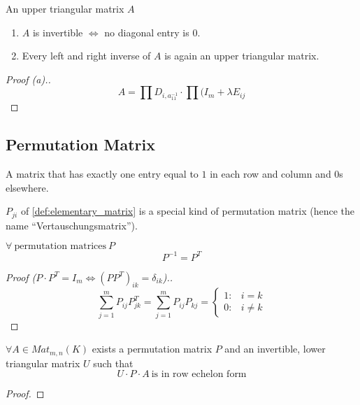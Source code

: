 \begin{proposition}
   An upper triangular matrix \(A\)

   \begin{enumerate}[label=(\alph*)]
      \item \(A\) is invertible \(\iff\) no diagonal entry is 0.
      \item Every left and right inverse of \(A\) is again an upper triangular matrix.
   \end{enumerate}
\end{proposition}
\begin{proof}[Proof (a).]
   \[A = \prod D_{i, a_{11}^{-1}} \cdot \prod(I_m + \lambda E_{ij}\]
\end{proof}

\subsection{Permutation Matrix}
\begin{definition}
   A matrix that has exactly one entry equal to \(1\) in each row and column and 0s elsewhere.
\end{definition}
\begin{remark}
   \(P_{ji}\) of \cref{def:elementary_matrix} is a special kind of permutation matrix (hence the name ``Vertauschungsmatrix'').
\end{remark}

\begin{proposition}
   \(\forall~\text{permutation matrices}~P\)
   \[P^{-1} = P^T\]
\end{proposition}
\begin{proof}[Proof (\(P \cdot P^T = I_m \iff (P P^T)_{ik} = \delta_{ik}\)).]
   \[\sum_{j=1}^m P_{ij} P_{jk}^T = \sum_{j=1}^m P_{ij} P_{kj} = \begin{cases}1: & i=k\\ 0: & i \neq k\end{cases}\]
\end{proof}

\begin{theorem}
   \(\forall A \in Mat_{m,n}(K)\) exists a permutation matrix \(P\) and an invertible, lower triangular matrix \(U\) such that
   \[U \cdot P \cdot A~\text{is in row echelon form}\]
\end{theorem}
\begin{proof}
\end{proof}

